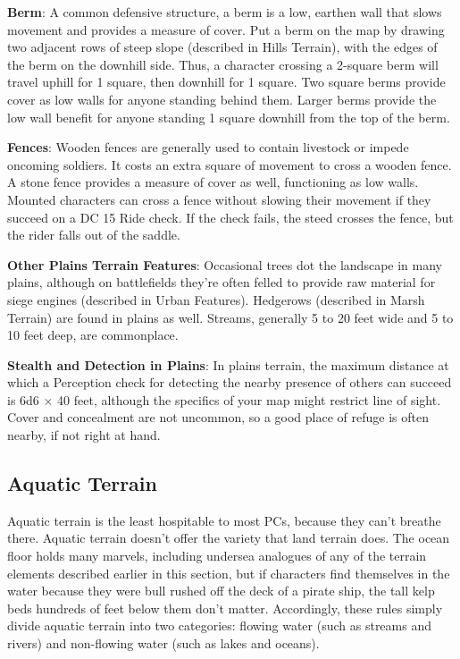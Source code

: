 \textbf{Berm}: A common defensive structure, a berm is a low, earthen wall that slows movement and provides a measure of cover. Put a berm on the map by drawing two adjacent rows of steep slope (described in Hills Terrain), with the edges of the berm on the downhill side. Thus, a character crossing a 2-square berm will travel uphill for 1 square, then downhill for 1 square. Two square berms provide cover as low walls for anyone standing behind them. Larger berms provide the low wall benefit for anyone standing 1 square downhill from the top of the berm. 
				
\textbf{Fences}: Wooden fences are generally used to contain livestock or impede oncoming soldiers. It costs an extra square of movement to cross a wooden fence. A stone fence provides a measure of cover as well, functioning as low walls. Mounted characters can cross a fence without slowing their movement if they succeed on a DC 15 Ride check. If the check fails, the steed crosses the fence, but the rider falls out of the saddle.
				
\textbf{Other Plains Terrain Features}: Occasional trees dot the landscape in many plains, although on battlefields they're often felled to provide raw material for siege engines (described in Urban Features). Hedgerows (described in Marsh Terrain) are found in plains as well. Streams, generally 5 to 20 feet wide and 5 to 10 feet deep, are commonplace.
				
\textbf{Stealth and Detection in Plains}: In plains terrain, the maximum distance at which a Perception check for detecting the nearby presence of others can succeed is 6d6 \mbox{$\times$} 40 feet, although the specifics of your map might restrict line of sight. Cover and concealment are not uncommon, so a good place of refuge is often nearby, if not right at hand.
				
\subsection{Aquatic Terrain}

				
Aquatic terrain is the least hospitable to most PCs, because they can't breathe there. Aquatic terrain doesn't offer the variety that land terrain does. The ocean floor holds many marvels, including undersea analogues of any of the terrain elements described earlier in this section, but if characters find themselves in the water because they were bull rushed off the deck of a pirate ship, the tall kelp beds hundreds of feet below them don't matter. Accordingly, these rules simply divide aquatic terrain into two categories: flowing water (such as streams and rivers) and non-flowing water (such as lakes and oceans).
				
